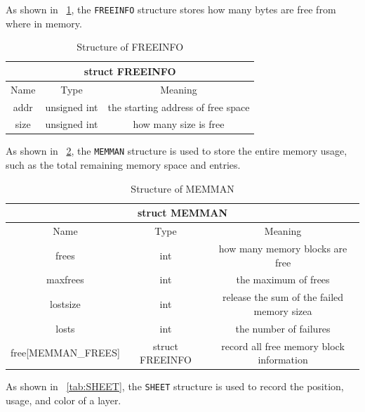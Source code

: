 \documentclass{swfcthesis}
\begin{document}
As shown in ~\ref{tab:FREEINFO}, the \texttt{FREEINFO} structure stores how many bytes are
free from where in memory.

\begin{table}[!htbp]
  \centering
  \begin{tabular}[c]{|c|c|c|}
    \hline
    \multicolumn{3}{|c|}{struct FREEINFO} \\
    \hline
    Name & Type & Meaning \\
    \hline
    addr & unsigned int & the starting address of free space \\
    \hline
    size & unsigned int & how many size is free \\
    \hline
  \end{tabular}
  \caption{Structure of FREEINFO}
  \label{tab:FREEINFO}
\end{table}

As shown in ~\ref{tab:MEMMAN}, the \texttt{MEMMAN} structure is used to store the entire
memory usage, such as the total remaining memory space and entries.
\begin{table}[!htbp]
  \centering
  \begin{tabular}[c]{|c|c|c|}
    \hline
    \multicolumn{3}{|c|}{struct MEMMAN} \\
    \hline
    Name & Type & Meaning \\
    \hline
    frees & int & how many memory blocks are free \\
    \hline
    maxfrees & int & the maximum of frees \\
    \hline
    lostsize & int & release the sum of the failed memory sizea \\
    \hline
    losts & int & the number of failures \\
    \hline
    free[MEMMAN\_FREES] & struct FREEINFO & record all free memory block information \\
    \hline
    
  \end{tabular}
  \caption{Structure of MEMMAN}
  \label{tab:MEMMAN}
\end{table}

As shown in ~\ref{tab:SHEET}, the \texttt{SHEET} structure is used to record the position,
usage, and color of a layer.
\end{document}

